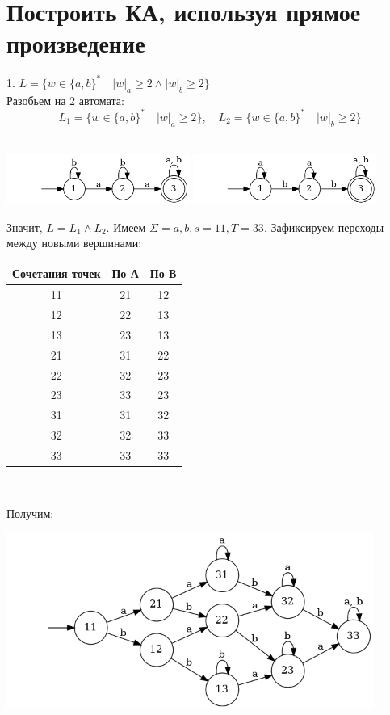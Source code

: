 \documentclass{article}
\begin{document}
\section{Построить КА, используя прямое произведение}

    1. $L = \{w \in \{a, b\}^* \quad |w|_a \geq 2 \wedge |w|_b \geq 2\}$\\
    Разобьем на 2 автомата:
    $$L_1 = \{w \in \{a, b\}^* \quad |w|_a \geq 2\}, \quad L_2 = \{w \in \{a, b\}^* \quad |w|_b \geq 2\}$$\\
    \begin{center}
        \includegraphics[width=0.45\textwidth]{pic7.dot}
        \includegraphics[width=0.45\textwidth]{pic4.dot}
    \end{center}
    Значит, $L = L_1 \wedge L_2$. Имеем $\Sigma = {a, b}, s = 11, T = 33$. Зафиксируем переходы между новыми вершинами:
    \begin{center}
        \begin{tabular}{|c|c|c|}
            \hline
            Сочетания точек & По А & По В \\
            \hline
            11 & 21 & 12\\
            12 & 22 & 13\\
            13 & 23 & 13\\
            21 & 31 & 22\\
            22 & 32 & 23\\
            23 & 33 & 23\\
            31 & 31 & 32\\
            32 & 32 & 33\\
            33 & 33 & 33\\
            \hline
        \end{tabular}\\
    \end{center}
    Получим:
    \begin{center}
        \includegraphics[width=0.9\textwidth]{pic8.dot}\\
    \end{center}
    
\end{document}
